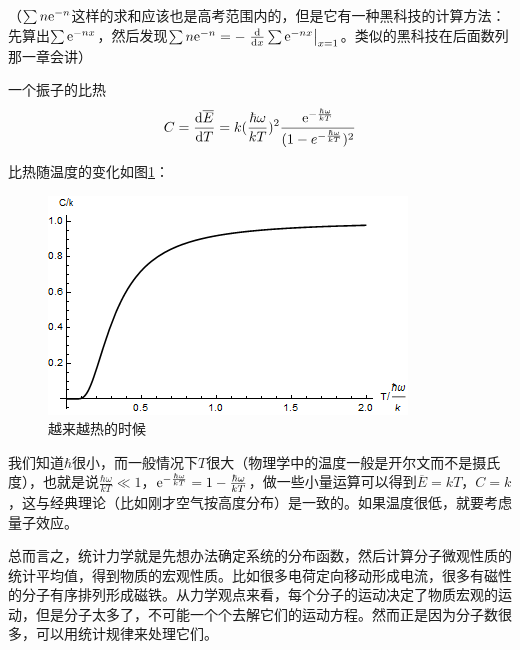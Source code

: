 （$\sum n \mathrm{e}^{-n}$这样的求和应该也是高考范围内的，但是它有一种黑科技的计算方法：先算出$\sum \mathrm{e}^{-n x}$，然后发现$\sum n \mathrm{e}^{-n}=-\left. \frac{\mathop{}\!\mathrm{d}}{\mathop{}\!\mathrm{d} x} \sum \mathrm{e}^{-n x} \right|_{x=1}$。类似的黑科技在后面数列那一章会讲）

一个振子的比热
\begin{equation*}
C=\frac{\mathop{}\!\mathrm{d} \overline{E}}{\mathop{}\!\mathrm{d} T}=k (\frac{\hbar \omega}{k T})^2 \frac{\mathrm{e}^{-\frac{\hbar \omega}{k T}}}{(1-e^{-\frac{\hbar \omega}{k T}})^2}
\end{equation*}

比热随温度的变化如图\ref{fig-quant-osc-c}：
\begin{figure}[htb]
\centering
\includegraphics[width=0.33\linewidth]{fig/quant-osc-c.png}
\caption{越来越热的时候}
\label{fig-quant-osc-c}
\end{figure}

我们知道$\hbar$很小，而一般情况下$T$很大（物理学中的温度一般是开尔文而不是摄氏度），也就是说$\frac{\hbar \omega}{k T} \ll 1$，$\mathrm{e}^{-\frac{\hbar \omega}{k T}}=1-\frac{\hbar \omega}{k T}$，做一些小量运算可以得到$\overline{E}=k T$，$C=k$，这与经典理论（比如刚才空气按高度分布）是一致的。如果温度很低，就要考虑量子效应。

总而言之，统计力学就是先想办法确定系统的分布函数，然后计算分子微观性质的统计平均值，得到物质的宏观性质。比如很多电荷定向移动形成电流，很多有磁性的分子有序排列形成磁铁。从力学观点来看，每个分子的运动决定了物质宏观的运动，但是分子太多了，不可能一个个去解它们的运动方程。然而正是因为分子数很多，可以用统计规律来处理它们。
